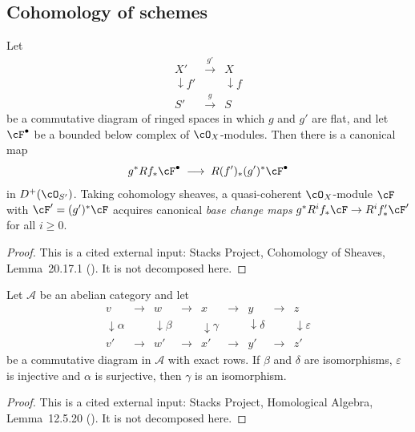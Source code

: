 \subsection{Cohomology of schemes}



\begin{lemma}
\label{lem:pc-base-change-map}
Let
\[
\begin{array}{ccc}
X' & \xrightarrow{g'} & X\\[-2pt]
\downarrow{\scriptstyle f'} & & \downarrow{\scriptstyle f}\\[-2pt]
S' & \xrightarrow{g} & S
\end{array}
\]
be a commutative diagram of ringed spaces in which $g$ and $g'$ are flat,
and let $\cF^\bullet$ be a bounded below complex of $\cO_X$-modules.  Then
there is a canonical map
\[
g^*Rf_*\cF^\bullet\;\longrightarrow\;R(f')_*(g')^*\cF^\bullet
\]
in $D^+(\cO_{S'})$.  Taking cohomology sheaves, a quasi-coherent
$\cO_X$-module $\cF$ with $\cF'=(g')^*\cF$ acquires canonical
\emph{base change maps} $g^*R^if_*\cF\to R^if'_*\cF'$ for all $i\ge0$.
\end{lemma}
\begin{proof}
This is a cited external input: Stacks Project, Cohomology of Sheaves,
Lemma~20.17.1 ().  It is not decomposed here.
\end{proof}

\begin{lemma}
\label{lem:pc-five-lemma}
Let $\mathcal A$ be an abelian category and let
\[
\begin{array}{ccccccccc}
v & \to & w & \to & x & \to & y & \to & z\\[-2pt]
\downarrow{\scriptstyle\alpha} & & \downarrow{\scriptstyle\beta} & &
\downarrow{\scriptstyle\gamma} & & \downarrow{\scriptstyle\delta} & &
\downarrow{\scriptstyle\varepsilon}\\[-2pt]
v' & \to & w' & \to & x' & \to & y' & \to & z'
\end{array}
\]
be a commutative diagram in $\mathcal A$ with exact rows.  If $\beta$
and $\delta$ are isomorphisms, $\varepsilon$ is injective and $\alpha$
is surjective, then $\gamma$ is an isomorphism.
\end{lemma}
\begin{proof}
This is a cited external input: Stacks Project, Homological Algebra,
Lemma~12.5.20 ().  It is not decomposed here.
\end{proof}

